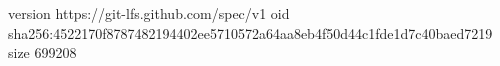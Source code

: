 version https://git-lfs.github.com/spec/v1
oid sha256:4522170f8787482194402ee5710572a64aa8eb4f50d44c1fde1d7c40baed7219
size 699208
